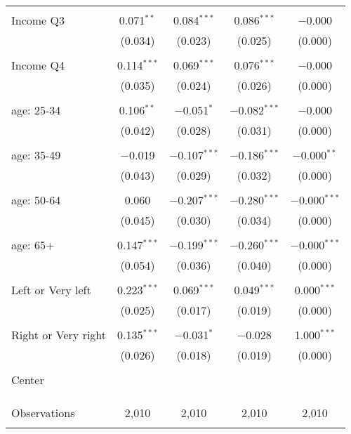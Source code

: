 \begin{tabular}{@{\extracolsep{5pt}}lcccc}
  & & & & \\ 
 Income Q3 & 0.071$^{**}$ & 0.084$^{***}$ & 0.086$^{***}$ & $-$0.000 \\ 
  & (0.034) & (0.023) & (0.025) & (0.000) \\ 
  & & & & \\ 
 Income Q4 & 0.114$^{***}$ & 0.069$^{***}$ & 0.076$^{***}$ & $-$0.000 \\ 
  & (0.035) & (0.024) & (0.026) & (0.000) \\ 
  & & & & \\ 
 age: 25-34 & 0.106$^{**}$ & $-$0.051$^{*}$ & $-$0.082$^{***}$ & $-$0.000 \\ 
  & (0.042) & (0.028) & (0.031) & (0.000) \\ 
  & & & & \\ 
 age: 35-49 & $-$0.019 & $-$0.107$^{***}$ & $-$0.186$^{***}$ & $-$0.000$^{**}$ \\ 
  & (0.043) & (0.029) & (0.032) & (0.000) \\ 
  & & & & \\ 
 age: 50-64 & 0.060 & $-$0.207$^{***}$ & $-$0.280$^{***}$ & $-$0.000$^{***}$ \\ 
  & (0.045) & (0.030) & (0.034) & (0.000) \\ 
  & & & & \\ 
 age: 65+ & 0.147$^{***}$ & $-$0.199$^{***}$ & $-$0.260$^{***}$ & $-$0.000$^{***}$ \\ 
  & (0.054) & (0.036) & (0.040) & (0.000) \\ 
  & & & & \\ 
 Left or Very left & 0.223$^{***}$ & 0.069$^{***}$ & 0.049$^{***}$ & 0.000$^{***}$ \\ 
  & (0.025) & (0.017) & (0.019) & (0.000) \\ 
  & & & & \\ 
 Right or Very right & 0.135$^{***}$ & $-$0.031$^{*}$ & $-$0.028 & 1.000$^{***}$ \\ 
  & (0.026) & (0.018) & (0.019) & (0.000) \\ 
  & & & & \\ 
 Center &  &  &  &  \\ 
  &  &  &  &  \\ 
  & & & & \\ 
\hline \\[-1.8ex] 

Observations & 2,010 & 2,010 & 2,010 & 2,010 \\ 
\hline 
\hline \\[-1.8ex] 
\end{tabular} 